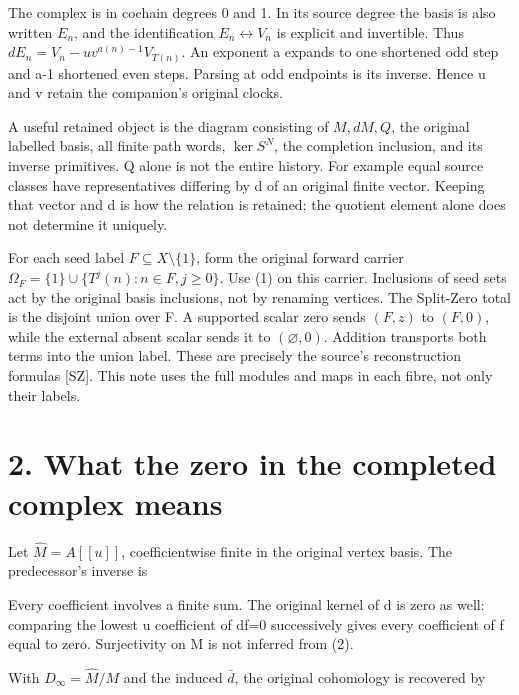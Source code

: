 The complex is in cochain degrees 0 and 1. In its source degree the
basis is also written \(E_n\), and the identification
\(E_n\leftrightarrow V_n\) is explicit and invertible. Thus
\(dE_n=V_n-u v^{a(n)-1}V_{T(n)}\). An exponent a expands to one
shortened odd step and a-1 shortened even steps. Parsing at odd
endpoints is its inverse. Hence u and v retain the companion's original
clocks.

A useful retained object is the diagram consisting of \(M,dM,Q\), the
original labelled basis, all finite path words, \(\ker S^N\), the
completion inclusion, and its inverse primitives. Q alone is not the
entire history. For example equal source classes have representatives
differing by d of an original finite vector. Keeping that vector and d
is how the relation is retained; the quotient element alone does not
determine it uniquely.

For each seed label \(F\subseteq X\setminus\{1\}\), form the original
forward carrier \(\Omega_F=\{1\}\cup\{T^j(n):n\in F,j\ge0\}\). Use (1)
on this carrier. Inclusions of seed sets act by the original basis
inclusions, not by renaming vertices. The Split-Zero total is the
disjoint union over F. A supported scalar zero sends \((F,z)\) to
\((F,0)\), while the external absent scalar sends it to
\((\varnothing,0)\). Addition transports both terms into the union
label. These are precisely the source's reconstruction formulas
{[}SZ{]}. This note uses the full modules and maps in each fibre, not
only their labels.

\section{2. What the zero in the completed complex means}

Let \(\widehat M=A[[u]]\), coefficientwise finite in the original vertex
basis. The predecessor's inverse is


Every coefficient involves a finite sum. The original kernel of d is
zero as well: comparing the lowest u coefficient of df=0 successively
gives every coefficient of f equal to zero. Surjectivity on M is not
inferred from (2).

With \(D_\infty=\widehat M/M\) and the induced \(\bar d\), the original
cohomology is recovered by


